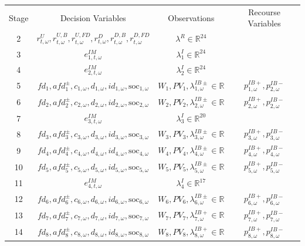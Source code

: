 \documentclass{article}
\newcommand{\R}{\mathbb{R}}
\newcommand{\soc}{\text{soc}}
\begin{document}
\begin{table}
\begin{tabular}{c c c c}
	Stage & Decision Variables & Observations & Recourse Variables \\
	
	2 & $r^U_{t, \omega}, r^{U, B}_{t, \omega}, r^{U, FD}_{t, \omega}, r^{D}_{t, \omega}, r^{D, B}_{t, \omega}, r^{D, FD}_{t, \omega}$ & $\lambda^R \in \R^{24}$ & \\
	3 & $e^{IM}_{1, t, \omega}$ & $\lambda^I_1 \in \R^{24}$ &  \\
	4 & $e^{IM}_{2, t, \omega}$ & $\lambda^I_2 \in \R^{24}$ &  \\
	5 & $fd_1, afd^{\pm}_1, c_{1, \omega}, d_{1, \omega}, id_{1, \omega}, \soc_{1, \omega}$ & $W_1, PV_1, \lambda^{IB\pm}_{1, \omega} \in \R$ & $p^{IB+}_{1, \omega}, p^{IB-}_{2, \omega}$  \\
	6 & $fd_2, afd^{\pm}_2, c_{2, \omega}, d_{2, \omega}, id_{2, \omega}, \soc_{2, \omega}$ & $W_2, PV_2, \lambda^{IB\pm}_{2, \omega} \in \R$ & $p^{IB+}_{2, \omega}, p^{IB-}_{2, \omega}$ \\
	7 & $e^{IM}_{3, t, \omega}$ & $\lambda^I_3 \in \R^{20}$ &  \\
	8 & $fd_3, afd^{\pm}_3, c_{3, \omega}, d_{3, \omega}, id_{3, \omega}, \soc_{3, \omega}$  & $W_3, PV_3, \lambda^{IB\pm}_{3, \omega} \in \R$ & $p^{IB+}_{3, \omega}, p^{IB-}_{3, \omega}$ \\
	9 & $fd_4, afd^{\pm}_4, c_{4, \omega}, d_{4, \omega}, id_{4, \omega}, \soc_{4, \omega}$ & $W_4, PV_4, \lambda^{IB\pm}_{4, \omega} \in \R$ & $p^{IB+}_{4, \omega}, p^{IB-}_{4, \omega}$ \\
	10 & $fd_5, afd^{\pm}_5, c_{5, \omega}, d_{5, \omega}, id_{5, \omega}, \soc_{5, \omega}$ & $W_5, PV_5, \lambda^{IB\pm}_{5, \omega} \in \R$ & $p^{IB+}_{5, \omega}, p^{IB-}_{5, \omega}$\\
	11 & $e^{IM}_{4, t, \omega}$  & $\lambda^I_4 \in \R^{17}$ &   \\
	12 & $fd_6, afd^{\pm}_6, c_{6, \omega}, d_{6, \omega}, id_{6, \omega}, \soc_{6, \omega}$ & $W_6, PV_6, \lambda^{IB\pm}_{6, \omega} \in \R$ & $p^{IB+}_{6, \omega}, p^{IB-}_{6, \omega}$ \\
	13 & $fd_7, afd^{\pm}_7, c_{7, \omega}, d_{7, \omega}, id_{7, \omega}, \soc_{7, \omega}$ & $W_7, PV_7, \lambda^{IB+}_{7, \omega} \in \R$ & $p^{IB+}_{7, \omega}, p^{IB-}_{7, \omega}$ \\
	14 & $fd_8, afd^{\pm}_8, c_{8, \omega}, d_{8, \omega}, id_{8, \omega}, \soc_{8, \omega}$ & $W_8, PV_8, \lambda^{IB+}_{8, \omega} \in \R$ & $p^{IB+}_{8, \omega}, p^{IB-}_{8, \omega}$ \\

\end{tabular}
\end{table}
\end{document}
